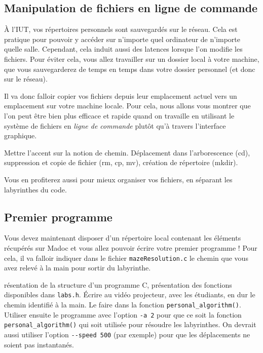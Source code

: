 \documentclass[a4paper]{article}
\newenvironment{enseignants}[1]{\noindent\color{blue}{\bf #1}}{}
\begin{document}
\subsection{Manipulation de fichiers en ligne de commande}

À l'IUT, vos répertoires personnels sont sauvegardés sur le réseau. Cela est pratique pour pouvoir y accéder sur n'importe quel ordinateur de n'importe quelle salle. Cependant, cela induit aussi des latences lorsque l'on modifie les fichiers.
Pour éviter cela, vous allez travailler sur un dossier local à votre machine, que vous sauvegarderez de temps en temps dans votre dossier personnel (et donc sur le réseau).

Il va donc falloir copier vos fichiers depuis leur emplacement actuel vers un emplacement sur votre machine locale. Pour cela, nous allons vous montrer que l’on peut être bien plus efficace et rapide quand on travaille en utilisant le système de fichiers en \emph{ligne de commande} plutôt qu'à travers l’interface graphique.

\begin{enseignants}{Système de fichiers~:}
  Mettre l'accent sur la notion de chemin.
  Déplacement dans l’arborescence (cd), suppression et copie de fichier (rm, cp, mv), création de répertoire (mkdir).
\end{enseignants}

Vous en profiterez aussi pour mieux organiser vos fichiers, en séparant les labyrinthes du code.

\subsection{Premier programme}

Vous devez maintenant disposer d’un répertoire local contenant les éléments récupérés sur Madoc et vous allez pouvoir écrire votre premier programme !
Pour cela, il va falloir indiquer dans le fichier \texttt{mazeResolution.c} le chemin que vous avez relevé à la main pour sortir du labyrinthe.

\begin{enseignants}
  Présentation de la structure d'un programme C, présentation des fonctions disponibles dans \verb|labs.h|. Écrire au vidéo projecteur, avec les étudiants, en dur le chemin identifié à la main.
  Le faire dans la fonction \verb|personal_algorithm()|.
  Utiliser ensuite le programme avec l'option \verb|-a 2| pour que ce soit la fonction \verb|personal_algorithm()| qui soit utilisée pour résoudre les labyrinthes.
  On devrait aussi utiliser l'option \verb|--speed 500| (par exemple) pour que les déplacements ne soient pas instantanés.
\end{enseignants}
\end{document}
